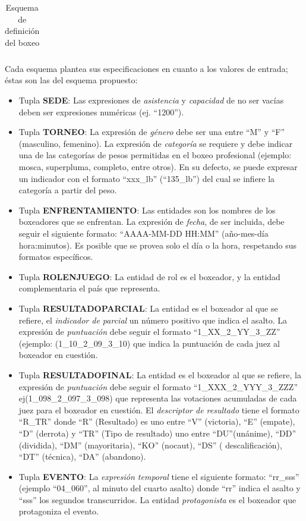 \begin{table}[]
\begin{tabular}{|c|c|}
    \end{tabular}
    \caption{Esquema de definición del boxeo}
    \label{tab:boxeo esquema}
    \end{table}

    Cada esquema plantea sus especificaciones en cuanto a los valores de entrada; éstas son las del esquema propuesto:

    \begin{itemize}
        \item Tupla \textbf{SEDE}: Las expresiones de \textit{asistencia} y \textit{capacidad} de no ser vacías deben ser expresiones numéricas (ej. “1200”).
        \item Tupla \textbf{TORNEO}: La expresión de \textit{género} debe ser una entre “M” y “F” (masculino, femenino). La expresión de \textit{categoría} se requiere 
        y debe indicar una de las categorías de pesos permitidas en el boxeo profesional (ejemplo: mosca, superpluma, completo, entre otros). En su defecto, se puede expresar un indicador con 
        el formato “xxx\_lb” (“135\_lb”) del cual se infiere la categoría a partir del peso.
        \item Tupla \textbf{ENFRENTAMIENTO}: Las entidades son los nombres de los boxeadores que se enfrentan. La expresión de \textit{fecha}, de ser incluida, debe seguir
        el siguiente formato: “AAAA-MM-DD HH:MM” (año-mes-día hora:minutos). Es posible que se provea solo el día o la hora, respetando sus formatos específicos.
        \item Tupla \textbf{ROLENJUEGO}: La entidad de rol es el boxeador, y la entidad complementaria el país que representa.
        \item Tupla \textbf{RESULTADOPARCIAL}: La entidad es el boxeador al que se refiere, el \textit{indicador de parcial} un número positivo que indica el asalto. La expresión de \textit{puntuación} 
        debe seguir el formato  “1\_XX\_2\_YY\_3\_ZZ” (ejemplo: (1\_10\_2\_09\_3\_10) que indica la puntuación de cada juez al boxeador en cuestión.
        \item Tupla \textbf{RESULTADOFINAL}: La entidad es el boxeador al que se refiere, la expresión de \textit{puntuación} debe seguir el formato  “1\_XXX\_2\_YYY\_3\_ZZZ” ej(1\_098\_2\_097\_3\_098)
        que representa las votaciones acumuladas de cada juez para el boxeador en cuestión. El \textit{descriptor de resultado} tiene el formato “R\_TR” donde “R” (Resultado) es uno entre “V” (victoria), “E” (empate),
        “D” (derrota) y “TR” (Tipo de resultado) uno entre “DU”(unánime), “DD” (dividida), “DM” (mayoritaria), “KO” (nocaut), “DS” ( descalificación), “DT” (técnica), “DA” (abandono).
        \item Tupla \textbf{EVENTO}: La \textit{expresión temporal} tiene el siguiente formato: “rr\_sss” (ejemplo “04\_060”, al minuto del cuarto asalto) donde “rr” indica el asalto y “sss” los segundos transcurridos. 
        La entidad \textit{protagonista} es el boxeador que protagoniza el evento.
    \end{itemize}


